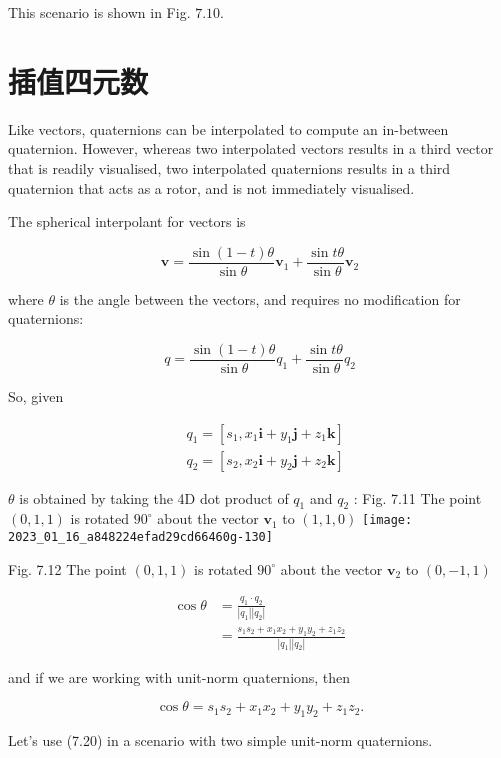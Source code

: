 This scenario is shown in Fig. $7.10$.

\section{插值四元数}
Like vectors, quaternions can be interpolated to compute an in-between quaternion. However, whereas two interpolated vectors results in a third vector that is readily visualised, two interpolated quaternions results in a third quaternion that acts as a rotor, and is not immediately visualised.

The spherical interpolant for vectors is

$$
\mathbf{v}=\frac{\sin (1-t) \theta}{\sin \theta} \mathbf{v}_{1}+\frac{\sin t \theta}{\sin \theta} \mathbf{v}_{2}
$$

where $\theta$ is the angle between the vectors, and requires no modification for quaternions:

$$
q=\frac{\sin (1-t) \theta}{\sin \theta} q_{1}+\frac{\sin t \theta}{\sin \theta} q_{2}
$$

So, given

$$
\begin{aligned}
& q_{1}=\left[s_{1}, x_{1} \mathbf{i}+y_{1} \mathbf{j}+z_{1} \mathbf{k}\right] \\
& q_{2}=\left[s_{2}, x_{2} \mathbf{i}+y_{2} \mathbf{j}+z_{2} \mathbf{k}\right]
\end{aligned}
$$

$\theta$ is obtained by taking the 4D dot product of $q_{1}$ and $q_{2}$ : Fig. 7.11 The point $(0,1,1)$ is rotated $90^{\circ}$ about the vector $\mathbf{v}_{1}$ to $(1,1,0)$
\texttt{[image: 2023\_01\_16\_a848224efad29cd66460g-130]}

Fig. 7.12 The point $(0,1,1)$ is rotated $90^{\circ}$ about the vector $\mathbf{v}_{2}$ to $(0,-1,1)$

$$
\begin{aligned}
\cos \theta & =\frac{q_{1} \cdot q_{2}}{\left|q_{1}\right|\left|q_{2}\right|} \\
& =\frac{s_{1} s_{2}+x_{1} x_{2}+y_{1} y_{2}+z_{1} z_{2}}{\left|q_{1}\right|\left|q_{2}\right|}
\end{aligned}
$$

and if we are working with unit-norm quaternions, then

$$
\cos \theta=s_{1} s_{2}+x_{1} x_{2}+y_{1} y_{2}+z_{1} z_{2} .
$$

Let's use (7.20) in a scenario with two simple unit-norm quaternions.

